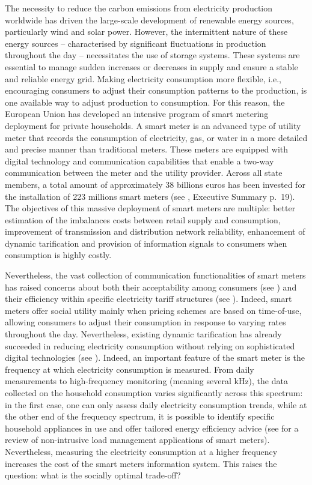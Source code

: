 \documentclass[a4paper,10pt]{article}
\theoremstyle{definition}
\theoremstyle{plain}
\numberwithin{equation}{section}
\begin{document}
The necessity to reduce the carbon emissions from electricity production worldwide has driven the large-scale development of renewable energy sources, particularly wind and solar power. However, the intermittent nature of these energy sources -- characterised by significant fluctuations in production throughout the day -- necessitates the use of storage systems. 
These systems are essential to manage sudden increases or decreases in supply and ensure a stable and reliable energy grid.  Making electricity consumption more flexible, i.e., encouraging consumers to adjust their consumption patterns to the  production, is one available way to adjust production to consumption. For this reason, the European Union has developed an intensive program of smart metering deployment for private households.  A smart meter is an advanced type of utility meter that records the consumption of electricity, gas, or water in a more detailed and precise manner than traditional meters. These meters are equipped with digital technology and communication capabilities that enable a two-way communication between the meter and the utility provider.  Across all state members, a total amount of approximately 38 billions euros has been invested for the installation of 223 millions smart meters (see \cite{Tounquet20}, Executive Summary p.~19).  The objectives of this massive deployment of smart meters are multiple: better estimation of the imbalances costs between retail supply and consumption, improvement of transmission and distribution network reliability, enhancement of dynamic tarification and provision of information signals to consumers when consumption is highly costly. 

Nevertheless, the vast collection of communication functionalities of smart meters has raised concerns about both their acceptability among consumers (see \cite{Pepermans14}) and their efficiency within specific electricity tariff structures (see \cite{Dato20, Nouicer23}). Indeed, smart meters offer social utility mainly when pricing schemes are based on time-of-use, allowing consumers to adjust their consumption in response to varying rates throughout the day.
Nevertheless, existing dynamic tarification has already succeeded in reducing electricity consumption without relying on sophisticated digital technologies (see \cite{Faruqui10}).  Indeed, an important feature of the smart meter is the frequency at which electricity consumption is measured. From daily measurements to high-frequency monitoring (meaning several kHz), the data collected on the household consumption varies significantly across this spectrum: in the first case, one can only assess daily electricity consumption trends, while at the other end of the frequency spectrum, it is possible to identify specific household appliances in use and offer tailored energy efficiency advice (see \cite{Schirmer23} for a review of non-intrusive load management applications of smart meters). Nevertheless, measuring the electricity consumption at a higher frequency increases the cost of the smart meters information system. This raises the question: what is the socially optimal trade-off?
\end{document}

